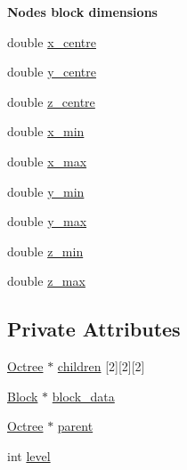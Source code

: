 \begin{Indent}{\bf Node\textquotesingle{}s block dimensions}\par
\begin{DoxyCompactItemize}
\item 
double \hyperlink{classmy_octree_1_1_octree_afc540845d8c6d0db88f964d13126e52a}{x\+\_\+centre}
\item 
double \hyperlink{classmy_octree_1_1_octree_aa771f7943a94365aadb387a596b37716}{y\+\_\+centre}
\item 
double \hyperlink{classmy_octree_1_1_octree_a77e1cbfe3f0c11f2dd7bb682a1f2bc1e}{z\+\_\+centre}
\item 
double \hyperlink{classmy_octree_1_1_octree_af8b1fb4444afb1efc5cbcefc47443a58}{x\+\_\+min}
\item 
double \hyperlink{classmy_octree_1_1_octree_a2a3291b5250cd29845ce2b8a6a4745d7}{x\+\_\+max}
\item 
double \hyperlink{classmy_octree_1_1_octree_a3a634a2744d467d6cc6393c35c34edd4}{y\+\_\+min}
\item 
double \hyperlink{classmy_octree_1_1_octree_adc54149b3555e1ed3d9a94e14cfbfd4f}{y\+\_\+max}
\item 
double \hyperlink{classmy_octree_1_1_octree_a8681e21690dc7dabb18c2b3541e20817}{z\+\_\+min}
\item 
double \hyperlink{classmy_octree_1_1_octree_a1ec71e5c3e48edf04aa20639dd055e79}{z\+\_\+max}
\end{DoxyCompactItemize}
\end{Indent}
\subsection*{Private Attributes}
\begin{DoxyCompactItemize}
\item 
\hyperlink{classmy_octree_1_1_octree}{Octree} $\ast$ \hyperlink{classmy_octree_1_1_octree_a2600c7d4ed026f4566412ba67feba623}{children} \mbox{[}2\mbox{]}\mbox{[}2\mbox{]}\mbox{[}2\mbox{]}
\item 
\hyperlink{classmy_octree_1_1_block}{Block} $\ast$ \hyperlink{classmy_octree_1_1_octree_a9fb4c2bd32aa53ede33abc49aff9884a}{block\+\_\+data}
\item 
\hyperlink{classmy_octree_1_1_octree}{Octree} $\ast$ \hyperlink{classmy_octree_1_1_octree_a3a3b56d332ffeb81743005d11d3a7942}{parent}
\item 
int \hyperlink{classmy_octree_1_1_octree_a4f032a94e51ee90c4d97a3acfea9419d}{level}
\end{DoxyCompactItemize}


